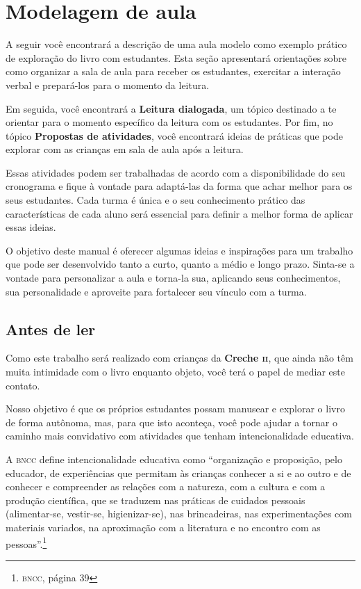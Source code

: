 \documentclass[11pt]{extarticle}
\begin{document}
\section{Modelagem de aula}
A seguir você encontrará a descrição de uma aula modelo como exemplo 
prático de exploração do livro com estudantes. Esta seção apresentará 
orientações sobre como organizar a sala de aula para receber os 
estudantes, exercitar a interação verbal e prepará-los para o 
momento da leitura.

Em seguida, você encontrará a \textbf{Leitura dialogada}, um 
tópico destinado a te orientar para o momento específico da 
leitura com os estudantes. Por fim, no tópico 
\textbf{Propostas de atividades}, você encontrará ideias 
de práticas que pode explorar com as crianças em sala de 
aula após a leitura. 

Essas atividades podem ser trabalhadas de acordo com a 
disponibilidade do seu cronograma e fique à vontade para adaptá-las 
da forma que achar melhor para os seus estudantes. Cada turma é única 
e o seu conhecimento prático das características de cada aluno será 
essencial para definir a melhor forma de aplicar essas ideias. 

O objetivo deste manual é oferecer algumas ideias 
e inspirações para um trabalho que pode ser desenvolvido tanto 
a curto, quanto a médio e longo prazo. Sinta-se a vontade para 
personalizar a aula e torna-la sua, aplicando seus conhecimentos, sua 
personalidade e aproveite para fortalecer 
seu vínculo com a turma.


\subsection{Antes de ler}


Como este trabalho será realizado com crianças da \textbf{Creche \textsc{ii}}, 
que ainda não têm muita intimidade com o livro enquanto objeto, você terá o 
papel de mediar este contato. 

Nosso objetivo é que os próprios estudantes possam manusear 
e explorar o livro de forma autônoma, mas, para que isto aconteça, você 
pode ajudar a tornar o caminho mais convidativo com atividades que tenham 
intencionalidade educativa. 

A \textsc{bncc} define intencionalidade educativa como ``organização 
e proposição, pelo educador, de experiências que permitam às crianças 
conhecer a si e ao outro e de conhecer e compreender as relações com a 
natureza, com a cultura e com a produção científica, que se traduzem nas 
práticas de cuidados pessoais (alimentar-se, vestir-se, higienizar-se), 
nas brincadeiras, nas experimentações com materiais 
variados, na aproximação com a literatura e no encontro com as 
pessoas''.\footnote{\textsc{bncc}, página 39}
\end{document}
